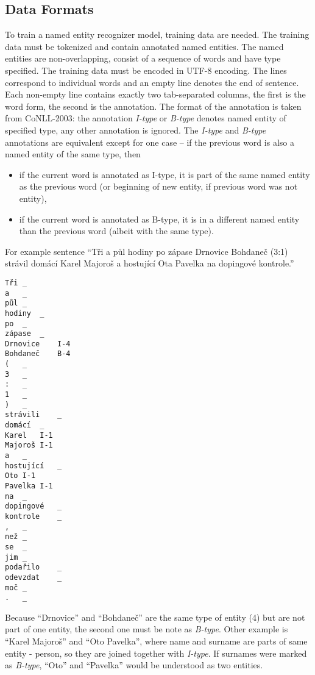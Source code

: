 \subsection{Data Formats}
To train a named entity recognizer model, training data are needed. The training
data must be tokenized and contain annotated named entities. The named entities
are non-overlapping, consist of a sequence of words and have type specified.
The training data must be encoded in UTF-8 encoding. The lines correspond to
individual words and an empty line denotes the end of sentence. Each non-empty
line contains exactly two tab-separated columns, the first is the word form, the
second is the annotation. The format of the annotation is taken from CoNLL-2003:
the annotation {\it I-type} or {\it B-type} denotes named entity of specified
type, any other annotation is ignored. The {\it I-type} and {\it B-type}
annotations are equivalent except for one case – if the previous word is also a
named entity of the same type, then
\begin{itemize}
\item{}if the current word is annotated as I-type, it is part of the same named
entity as the previous word (or beginning of new entity, if previous word was
not entity),
\item{}if the current word is annotated as B-type, it is in a different named
entity than the previous word (albeit with the same type).
\end{itemize}

For example sentence ``Tři a půl hodiny po zápase Drnovice Bohdaneč (3:1) strávil domácí Karel Majoroš a hostující Ota Pavelka na dopingové kontrole.''

\begin{lstlisting}[frame=single]
Tři	_
a	_
půl	_
hodiny	_
po	_
zápase	_
Drnovice	I-4
Bohdaneč	B-4
(	_
3	_
:	_
1	_
)	_
strávili	_
domácí	_
Karel	I-1
Majoroš	I-1
a	_
hostující	_
Oto	I-1
Pavelka	I-1
na	_
dopingové	_
kontrole	_
,	_
než	_
se	_
jim	_
podařilo	_
odevzdat	_
moč	_
.	_
\end{lstlisting}

Because ``Drnovice'' and ``Bohdaneč'' are the same type of entity (4) but are
not part of one entity, the second one must be note as \emph{B-type}.
Other example is ``Karel Majoroš'' and ``Oto Pavelka'', where name and surname
are parts of same entity - person, so they are joined together with \emph{I-type}.
If surnames were marked as {\it B-type}, ``Oto'' and ``Pavelka'' would be
understood as two entities.
